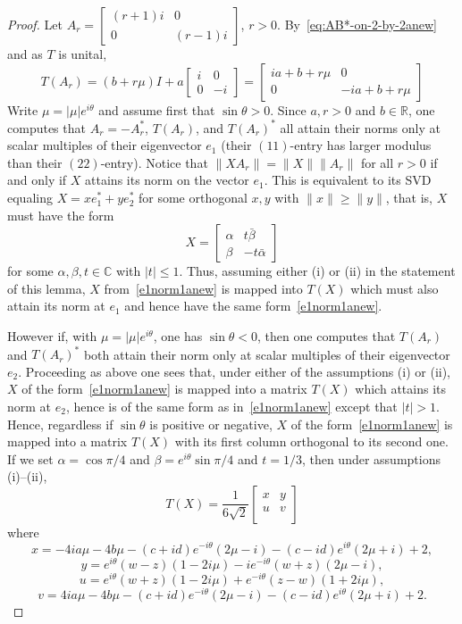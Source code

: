 \documentclass[10pt,a4paper]{amsart}
\def\IC{{\mathbb C}}
\def\IR{{\mathbb R}}
\begin{document}
\begin{proof}
Let $A_r = \begin{bmatrix} (r+1)i& 0 \\ 0 & (r-1)i \end{bmatrix}$, $r>0$. By~\eqref{eq:AB*-on-2-by-2anew} and as $T$ is unital,
$$T(A_r)=(b+r\mu) I +a\begin{bmatrix} i &0 \\ 0 & -i \end{bmatrix} = \begin{bmatrix}
 i a +b +r\mu  & 0 \\
 0 & -i a +b +r\mu
 \end{bmatrix} $$
Write $\mu=|\mu|e^{i\theta}$ and assume first that $\sin\theta>0$. Since $a,r>0$ and $b\in\IR$, one computes that
$A_r=-A_r^\ast$, $T(A_r)$, and $T(A_r)^\ast$ all
 attain their norms only at scalar multiples of their eigenvector $e_1$ (their $(11)$-entry has larger modulus than their $(22)$-entry).  Notice that $\|XA_r\| = \|X \| \|A_r\|$  for all $r > 0$ if and only if $X$
attains its norm on the vector $e_1$.
 This is equivalent to its SVD equaling $X =x e_1^\ast+ye_2^\ast$ for some orthogonal $x,y$ with $\|x\|\ge \|y\|$,  that is, $X$ must have the form
\begin{equation}\label{e1norm1anew}
X = \begin{bmatrix} \alpha & t \bar{\beta} \\ \beta & -t\bar{\alpha} \end{bmatrix}
\end{equation}
for some $\alpha, \beta, t \in \IC$ with $|t| \leq 1$. Thus, assuming either (i) or (ii) in the statement of this lemma, $X$ from~\eqref{e1norm1anew} is mapped into $T(X)$ which must also attain its norm at $e_1$ and hence have the same form~\eqref{e1norm1anew}.

However if, with $\mu=|\mu|e^{i\theta}$, one has $\sin\theta<0$, then  one computes that $T(A_r)$ and $T(A_r)^*$ both attain their
norm only at scalar multiples of their eigenvector $e_2$. Proceeding as above one sees that, under either of the assumptions (i) or (ii), $X$ of the form~\eqref{e1norm1anew} is mapped into a matrix $T(X)$ which attains its norm at $e_2$, hence is of the same form  as in~\eqref{e1norm1anew}  except that $|t| >1$. Hence, regardless if $\sin\theta$ is positive or negative, $X$ of the form~\eqref{e1norm1anew} is mapped into a matrix $T(X)$ with  its first  column orthogonal to its  second one.
 If we set $\alpha=\cos\pi/4$ and $\beta = e^{i\theta}\sin\pi/4$ and $t=1/3$, then under assumptions (i)--(ii),
$$T(X) = \frac{1}{6 \sqrt{2}}
\begin{bmatrix}
 x & y \\
 u & v \\
\end{bmatrix}$$
where
$$x=-4 i a \mu -4 b \mu -(c+i d) e^{-i \theta } (2 \mu -i)-(c-i d) e^{i \theta } (2 \mu +i)+2,$$
$$y =e^{i \theta } (w-z) (1-2 i \mu
   )-i e^{-i \theta } (w+z) (2 \mu -i),$$
$$u=e^{i \theta } (w+z) (1-2 i \mu )+e^{-i \theta } (z - w) (1 + 2 i  \mu),$$
$$v=4 i a \mu -4 b \mu -(c+i d) e^{-i \theta } (2 \mu
   -i)-(c-i d) e^{i \theta } (2 \mu +i)+2.$$


\end{proof}
\end{document}
